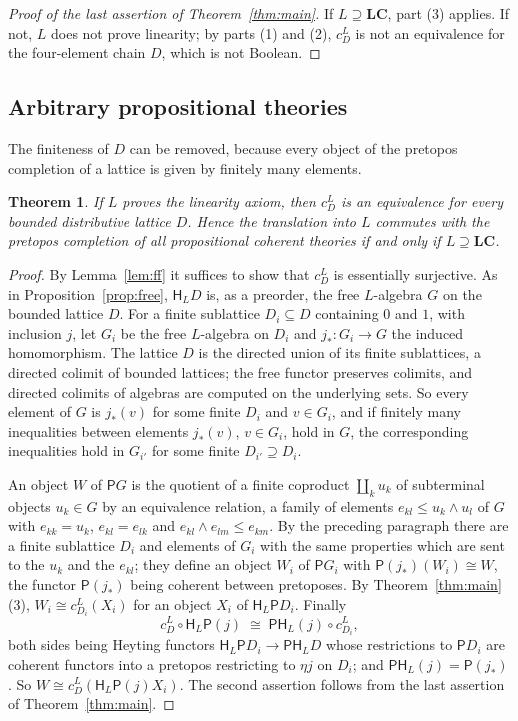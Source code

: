 \documentclass[11pt]{amsart}
\newtheorem{thm}{Theorem}[section]
\theoremstyle{definition}
\newcommand{\PP}{\mathsf P}
\newcommand{\HH}{\mathsf H}
\newcommand{\LC}{\mathbf{LC}}
\begin{document}
\begin{proof}[Proof of the last assertion of Theorem~\ref{thm:main}]
If $L\supseteq\LC$, part (3) applies. If not, $L$ does not prove
linearity; by parts (1) and (2), $c^L_D$ is not an equivalence for the
four-element chain $D$, which is not Boolean.
\end{proof}

\subsection*{Arbitrary propositional theories}
The finiteness of $D$ can be removed, because every object of the
pretopos completion of a lattice is given by finitely many elements.

\begin{thm}\label{thm:bounded}
If $L$ proves the linearity axiom, then $c^L_D$ is an equivalence for
every bounded distributive lattice $D$. Hence the translation into $L$
commutes with the pretopos completion of all propositional coherent
theories if and only if $L\supseteq\LC$.
\end{thm}
\begin{proof}
By Lemma~\ref{lem:ff} it suffices to show that $c^L_D$ is essentially
surjective. As in Proposition~\ref{prop:free}, $\HH_LD$ is, as a
preorder, the free $L$-algebra $G$ on the bounded lattice $D$. For a
finite sublattice $D_i\subseteq D$ containing $0$ and $1$, with inclusion $j$, let $G_i$ be
the free $L$-algebra on $D_i$ and $j_*\colon G_i\to G$ the induced
homomorphism. The lattice $D$ is the directed union of its finite
sublattices, a directed colimit of bounded lattices; the free functor
preserves colimits, and directed colimits of algebras are computed on
the underlying sets. So every element of $G$ is $j_*(v)$ for some
finite $D_i$ and $v\in G_i$, and if finitely many inequalities between
elements $j_*(v)$, $v\in G_i$, hold in $G$, the corresponding
inequalities hold in $G_{i'}$ for some finite $D_{i'}\supseteq D_i$.

An object $W$ of $\PP G$ is the quotient of a finite coproduct
$\coprod_ku_k$ of subterminal objects $u_k\in G$ by an equivalence
relation, a family of elements $e_{kl}\le u_k\wedge u_l$ of $G$ with
$e_{kk}=u_k$, $e_{kl}=e_{lk}$ and $e_{kl}\wedge e_{lm}\le e_{km}$. By
the preceding paragraph there are a finite sublattice $D_i$ and
elements of $G_i$ with the same properties which are sent to the
$u_k$ and the $e_{kl}$; they define an object $W_i$ of $\PP G_i$ with
$\PP(j_*)(W_i)\cong W$, the functor $\PP(j_*)$ being coherent between
pretoposes. By Theorem~\ref{thm:main}(3), $W_i\cong c^L_{D_i}(X_i)$ for
an object $X_i$ of $\HH_L\PP D_i$. Finally
\[
c^L_D\circ\HH_L\PP(j)\;\cong\;\PP\HH_L(j)\circ c^L_{D_i},
\]
both sides being Heyting functors $\HH_L\PP D_i\to\PP\HH_LD$ whose
restrictions to $\PP D_i$ are coherent functors into a pretopos
restricting to $\eta j$ on $D_i$; and $\PP\HH_L(j)=\PP(j_*)$. So
$W\cong c^L_D(\HH_L\PP(j)X_i)$. The second assertion follows from the
last assertion of Theorem~\ref{thm:main}.
\end{proof}
\end{document}
